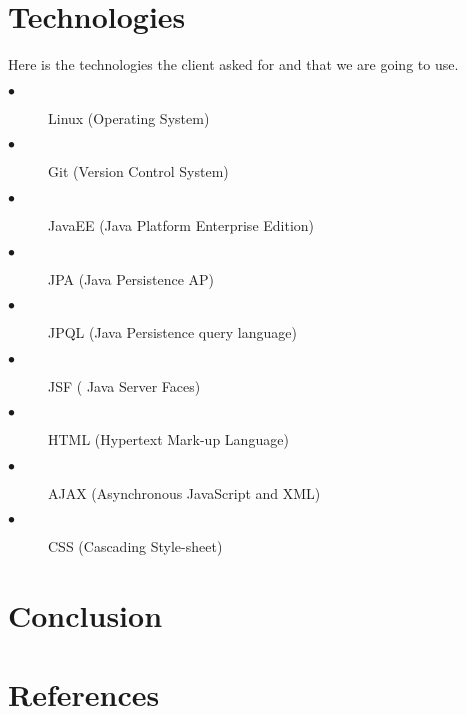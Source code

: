 \documentclass[hidelinks, 12pt]{article}
\begin{document}
\section{Technologies}
Here is the technologies the client asked for and that we are going to use.
\begin{description}
  \item[$\bullet$] Linux (Operating System)
  \item[$\bullet$] Git (Version Control System)
  \item[$\bullet$] JavaEE (Java Platform Enterprise Edition)
  \item[$\bullet$] JPA (Java Persistence AP)
  \item[$\bullet$] JPQL (Java Persistence query language)
  \item[$\bullet$] JSF ( Java Server Faces)
  \item[$\bullet$] HTML (Hypertext Mark-up Language)
  \item[$\bullet$] AJAX (Asynchronous JavaScript and XML)
  \item[$\bullet$] CSS (Cascading Style-sheet)

\end{description}
\section{Conclusion}

\section{References}
\end{document}
